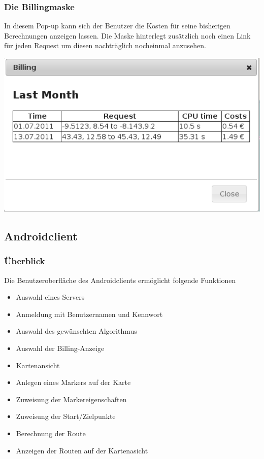 \documentclass[a4paper,10pt,titlepage]{article}
\begin{document}
\subsubsection{Die Billingmaske}
In diesem Pop-up kann sich der Benutzer die Kosten für seine bisherigen Berechnungen anzeigen lassen. Die Maske hinterlegt zusätzlich noch einen Link für jeden Request um diesen nachträglich nocheinmal anzusehen.
\begin {center}
\includegraphics[scale=0.5]{media/web/Billing.png}
\end {center}

\newpage
\subsection{Androidclient}

\subsubsection{Überblick}
Die Benutzeroberfläche des Androidclients ermöglicht folgende Funktionen
\begin{itemize}
\item Auswahl eines Servers
\item Anmeldung mit Benutzernamen und Kennwort
\item Auswahl des gewünschten Algorithmus
\item Auswahl der Billing-Anzeige 
\item Kartenansicht
\item Anlegen eines Markers auf der Karte
\item Zuweisung der Markereigenschaften
\item Zuweisung der Start/Zielpunkte
\item Berechnung der Route
\item Anzeigen der Routen auf der Kartenasicht
\end{itemize}
\end{document}
